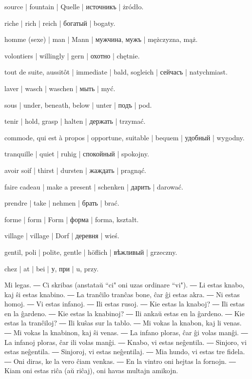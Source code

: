 \begin{ekzvocab}{1em}
 source | fountain | Quelle | источникъ | żródło.

 riche | rich | reich | богатый | bogaty.

 homme (sexe) | man | Mann | мужчина, мужъ | mężczyzna, mąż.

 volontiers | willingly | gern | охотно | chętnie.

 tout de suite, aussitôt | immediate | bald, sogleich | сейчасъ | natychmiast.

 laver | wasch | waschen | мыть | myć.

 sous | under, beneath, below | unter | подъ | pod.

 tenir | hold, grasp | halten | держать | trzymać.

 commode, qui est à propos | opportune, suitable | bequem | удобный | wygodny.

 tranquille | quiet | ruhig | спокойный | spokojny.

 avoir soif | thirst | dursten | жаждать | pragnąć.

 faire cadeau | make a present | schenken | дарить | darować.

 prendre | take | nehmen | брать | brać.

 forme | form | Form | форма | forma, kształt.

 village | village | Dorf | деревня | wieś.

 gentil, poli | polite, gentle | höflich | вѣжливый | grzeczny.

 chez | at | bei | у, при | u, przy.

\end{ekzvocab}



Mi legas. ― Ci skribas (anstataŭ ``ci" oni uzas ordinare ``vi"). ― Li estas knabo, kaj ŝi estas knabino. ― La tranĉilo tranĉas bone, ĉar ĝi estas akra. ― Ni estas homoj. ― Vi estas infanoj. ― Ili estas rusoj. ― Kie estas la knaboj? ― Ili estas en la ĝardeno. ― Kie estas la knabinoj? ― Ili ankaŭ estas en la ĝardeno. ― Kie estas la tranĉiloj? ― Ili kuŝas sur la tablo. ― Mi vokas la knabon, kaj li venas. ― Mi vokas la knabinon, kaj ŝi venas. ― La infano ploras, ĉar ĝi volas manĝi. ― La infanoj ploras, ĉar ili volas manĝi. ― Knabo, vi estas neĝentila. ― Sinjoro, vi estas neĝentila. ― Sinjoroj, vi estas neĝentilaj. ― Mia hundo, vi estas tre fidela. ― Oni diras, ke la vero ĉiam venkas. ― En la vintro oni hejtas la fornojn. ― Kiam oni estas riĉa (aŭ riĉaj), oni havas multajn amikojn.

